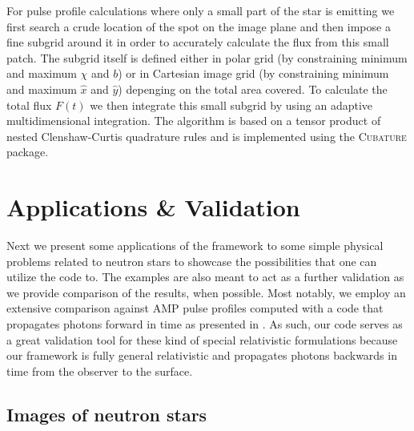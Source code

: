 \documentclass[iop, usenatbib]{emulateapj}
\begin{document}
For pulse profile calculations where only a small part of the star is
emitting we first search a crude location of the spot on the image plane
and then impose a fine subgrid around it in order to accurately
calculate the flux from this small patch.  The subgrid itself is defined
either in polar grid (by constraining minimum and maximum $\chi$ and
$b$) or in Cartesian image grid (by constraining minimum and maximum
$\hat{x}$ and $\hat{y}$) depenging on the total area covered.  To
calculate the total flux $F(t)$ we then integrate this small subgrid by
using an adaptive multidimensional integration.  The algorithm is based
on a tensor product of nested Clenshaw-Curtis quadrature rules and is
implemented using the \textsc{Cubature} package.




\section{Applications \& Validation}\label{sect:appl}

Next we present some applications of the framework to some simple physical problems related to neutron stars to showcase the possibilities that one can utilize the code to.
The examples are also meant to act as a further validation as we provide comparison of the results, when possible.
Most notably, we employ an extensive comparison against AMP pulse profiles computed with a code that propagates photons forward in time as presented in \citealt{PB06}.
As such, our code serves as a great validation tool for these kind of special relativistic formulations because our framework is fully general relativistic and propagates photons backwards in time from the observer to the surface.



\subsection{Images of neutron stars}
\end{document}
